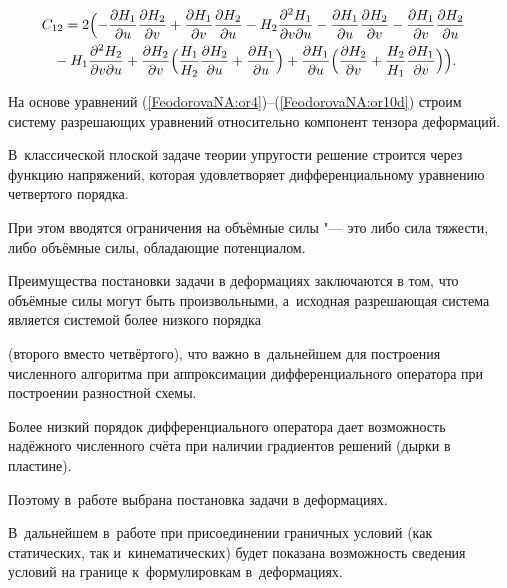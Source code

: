 \begin{eqnarray*}
&\!\!\!\!\!C_{12}=2\Bigl(-\frac{\partial H_1}{\partial u

}\frac{\partial H_2}{\partial v}+\frac{\partial H_1}{\partial

v}\frac{\partial H_2}{\partial u}-H_2\frac{\partial^2

H_1}{\partial v\partial u}-\frac{\partial H_1}{\partial

u}\frac{\partial H_2}{\partial v}- \frac{\partial H_1}{\partial

v}\frac{\partial H_2}{\partial u}\\

&-H_1\frac{\partial^2

H_2}{\partial v\partial u}+\frac{

\partial H_2}{\partial v}\Bigl(\frac{H_1}{H_2}\frac{\partial H_2}{\partial u}+\frac{\partial H_1}{\partial u}\Bigr)

+\frac{\partial H_1}{\partial u}

\Bigl(\frac{\partial H_2}{\partial

v}+\frac{H_2}{H_1} \frac{\partial H_1}{\partial v}\Bigr)\Bigr).

\end{eqnarray*}

На основе уравнений (\ref{FeodorovaNA:or4})--(\ref{FeodorovaNA:or10d}) строим систему разрешающих уравнений относительно компонент тензора деформаций. 

В~классической плоской задаче теории упругости \cite{FeodorovaNA:Tim} решение строится через функцию напряжений, которая удовлетворяет дифференциальному уравнению четвертого порядка. 

При этом вводятся ограничения на объёмные силы "--- это либо сила тяжести, либо объёмные силы, обладающие потенциалом. 

Преимущества постановки задачи в деформациях заключаются в том, что  объёмные силы могут быть произвольными, а~исходная разрешающая система является системой более низкого порядка

(второго вместо четвёртого), что важно в~дальнейшем для построения численного алгоритма при аппроксимации дифференциального оператора при построении разностной схемы. 

Более низкий порядок дифференциального оператора дает возможность надёжного численного счёта при наличии градиентов решений (дырки в пластине). 

Поэтому в~работе выбрана постановка задачи в деформациях. 

В~дальнейшем в~работе при присоединении граничных условий (как статических, так и~кинематических) будет показана возможность сведения условий на границе к~формулировкам в~деформациях.



